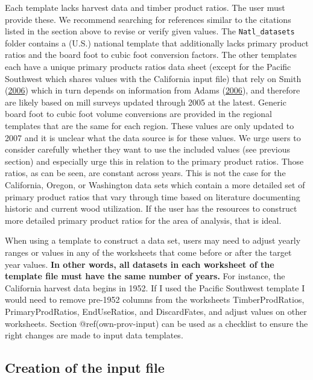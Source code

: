 \documentclass[
  openany]{book}
\begin{document}
Each template lacks harvest data and timber product ratios. The user
must provide these. We recommend searching for references similar to the
citations listed in the section above to revise or verify given values.
The \texttt{Natl\_datasets} folder contains a (U.S.) national template
that additionally lacks primary product ratios and the board foot to
cubic foot conversion factors. The other templates each have a unique
primary products ratios data sheet (except for the Pacific Southwest
which shares values with the California input file) that rely on Smith
(\protect\hyperlink{ref-smith2006}{2006}) which in turn depends on
information from Adams (\protect\hyperlink{ref-adams2006}{2006}), and
therefore are likely based on mill surveys updated through 2005 at the
latest. Generic board foot to cubic foot volume conversions are provided
in the regional templates that are the same for each region. These
values are only updated to 2007 and it is unclear what the data source
is for these values. We urge users to consider carefully whether they
want to use the included values (see previous section) and especially
urge this in relation to the primary product ratios. Those ratios, as
can be seen, are constant across years. This is not the case for the
California, Oregon, or Washington data sets which contain a more
detailed set of primary product ratios that vary through time based on
literature documenting historic and current wood utilization. If the
user has the resources to construct more detailed primary product ratios
for the area of analysis, that is ideal.

When using a template to construct a data set, users may need to adjust
yearly ranges or values in any of the worksheets that come before or
after the target year values. \textbf{In other words, all datasets in
each worksheet of the template file must have the same number of years.}
For instance, the California harvest data begins in 1952. If I used the
Pacific Southwest template I would need to remove pre-1952 columns from
the worksheets TimberProdRatios, PrimaryProdRatios, EndUseRatios, and
DiscardFates, and adjust values on other worksheets. Section
@ref(own-prov-input) can be used as a checklist to ensure the right
changes are made to input data templates.

\hypertarget{own-prov-input}{%
\subsection{Creation of the input file}\label{own-prov-input}}
\end{document}
